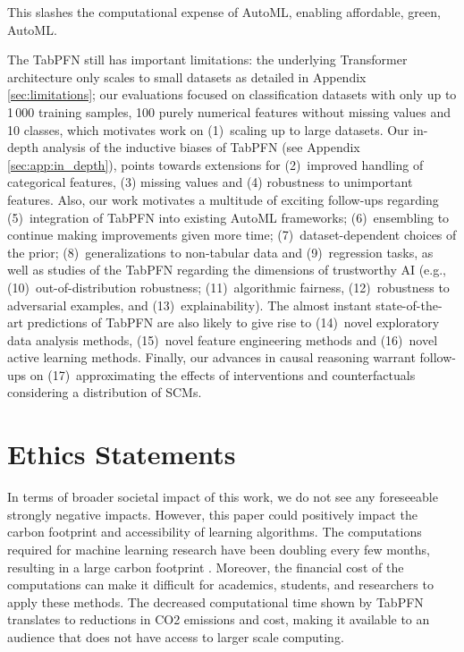 This slashes the computational expense of AutoML, enabling affordable, green, AutoML.

The TabPFN still has important limitations: the underlying Transformer architecture only scales to small datasets as detailed in Appendix \ref{sec:limitations}; our evaluations focused on classification datasets with only up to 1\,000 training samples, 100 purely numerical features without missing values and 10 classes, which motivates work on (1)~scaling up to large datasets. Our in-depth analysis of the inductive biases of TabPFN (see Appendix \ref{sec:app:in_depth}), points towards extensions for (2)~improved handling of categorical features, (3) missing values and (4) robustness to unimportant features. Also, our work motivates a multitude of exciting follow-ups regarding (5)~integration of TabPFN into existing AutoML frameworks; (6)~ensembling to continue making improvements given more time; (7)~dataset-dependent choices of the prior; (8)~generalizations to non-tabular data and (9)~regression tasks, as well as studies of the TabPFN regarding the dimensions of trustworthy AI (e.g., (10)~out-of-distribution robustness; (11)~algorithmic fairness, (12)~robustness to adversarial examples, and (13)~explainability). The almost instant state-of-the-art predictions of TabPFN are also likely to give rise to (14)~novel exploratory data analysis methods, (15)~novel feature engineering methods and (16)~novel active learning methods. Finally, our advances in causal reasoning warrant follow-ups on (17)~approximating the effects of interventions and counterfactuals considering a distribution of SCMs.

\section{Ethics Statements}
\label{sec:impacts}
In terms of broader societal impact of this work, we do not see any foreseeable strongly negative impacts. However, this paper could positively impact the carbon footprint and accessibility of learning algorithms. The computations required for machine learning research have been doubling every few months, resulting in a large carbon footprint \citep{schwartz2020green}. Moreover, the financial cost of the computations can make it difficult for academics, students, and researchers to apply these methods. The decreased computational time shown by TabPFN translates to reductions in CO2 emissions and cost, making it available to an audience that does not have access to larger scale computing. 

